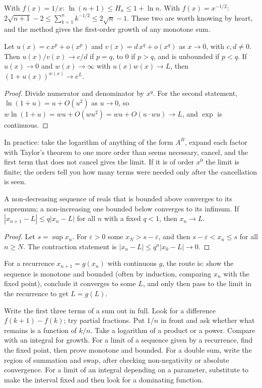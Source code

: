 With $f(x)=1/x$: $\ln(n+1)\le H_n\le 1+\ln n$. With $f(x)=x^{-1/2}$: $2\sqrt{n+1}-2\le\sum_{k=1}^n k^{-1/2}\le 2\sqrt n-1$. These two are worth knowing by heart, and the method gives the first-order growth of any monotone sum.

\begin{proposition}
Let $u(x)=c\,x^{p}+o(x^{p})$ and $v(x)=d\,x^{q}+o(x^{q})$ as $x\to 0$, with $c,d\ne 0$. Then $u(x)/v(x)\to c/d$ if $p=q$, to $0$ if $p>q$, and is unbounded if $p<q$. If $u(x)\to 0$ and $w(x)\to\infty$ with $u(x)w(x)\to L$, then $(1+u(x))^{w(x)}\to e^{L}$.
\end{proposition}

\begin{proof}
Divide numerator and denominator by $x^q$. For the second statement, $\ln(1+u)=u+O(u^2)$ as $u\to 0$, so $w\ln(1+u)=wu+O(wu^2)=wu+O(u\cdot wu)\to L$, and $\exp$ is continuous.
\end{proof}

In practice: take the logarithm of anything of the form $A^B$, expand each factor with Taylor's theorem to one more order than seems necessary, cancel, and the first term that does not cancel gives the limit. If it is of order $x^0$ the limit is finite; the orders tell you how many terms were needed only after the cancellation is seen.

\begin{theorem}
A non-decreasing sequence of reals that is bounded above converges to its supremum; a non-increasing one bounded below converges to its infimum. If $|x_{n+1}-L|\le q|x_n-L|$ for all $n$ with a fixed $q<1$, then $x_n\to L$.
\end{theorem}

\begin{proof}
Let $s=\sup x_n$. For $\varepsilon>0$ some $x_N>s-\varepsilon$, and then $s-\varepsilon<x_n\le s$ for all $n\ge N$. The contraction statement is $|x_n-L|\le q^n|x_0-L|\to 0$.
\end{proof}

For a recurrence $x_{n+1}=g(x_n)$ with continuous $g$, the route is: show the sequence is monotone and bounded (often by induction, comparing $x_n$ with the fixed point), conclude it converges to some $L$, and only then pass to the limit in the recurrence to get $L=g(L)$.

\begin{firstmoves}
Write the first three terms of a sum out in full. Look for a difference $f(k+1)-f(k)$; try partial fractions. Put $1/n$ in front and ask whether what remains is a function of $k/n$. Take a logarithm of a product or a power. Compare with an integral for growth. For a limit of a sequence given by a recurrence, find the fixed point, then prove monotone and bounded. For a double sum, write the region of summation and swap, after checking non-negativity or absolute convergence. For a limit of an integral depending on a parameter, substitute to make the interval fixed and then look for a dominating function.
\end{firstmoves}

